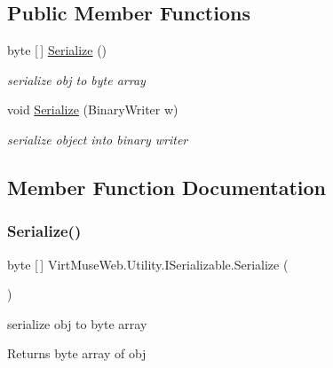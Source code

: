 \subsection*{Public Member Functions}
\begin{DoxyCompactItemize}
\item 
byte \mbox{[}$\,$\mbox{]} \mbox{\hyperlink{interface_virt_muse_web_1_1_utility_1_1_i_serializable_ab466c2a156753c658cff1e073606e9bd}{Serialize}} ()
\begin{DoxyCompactList}\small\item\em serialize obj to byte array \end{DoxyCompactList}\item 
void \mbox{\hyperlink{interface_virt_muse_web_1_1_utility_1_1_i_serializable_a99aed8cf41a4ed3ff1ccbedf84d89291}{Serialize}} (Binary\+Writer w)
\begin{DoxyCompactList}\small\item\em serialize object into binary writer \end{DoxyCompactList}\end{DoxyCompactItemize}


\subsection{Member Function Documentation}
\mbox{\label{interface_virt_muse_web_1_1_utility_1_1_i_serializable_ab466c2a156753c658cff1e073606e9bd}} 
\subsubsection{\texorpdfstring{Serialize()}{Serialize()}\hspace{0.1cm}{\footnotesize\ttfamily [1/2]}}
{\footnotesize\ttfamily byte \mbox{[}$\,$\mbox{]} Virt\+Muse\+Web.\+Utility.\+I\+Serializable.\+Serialize (\begin{DoxyParamCaption}{ }\end{DoxyParamCaption})}



serialize obj to byte array 

\begin{DoxyReturn}{Returns}
byte array of obj
\end{DoxyReturn}



